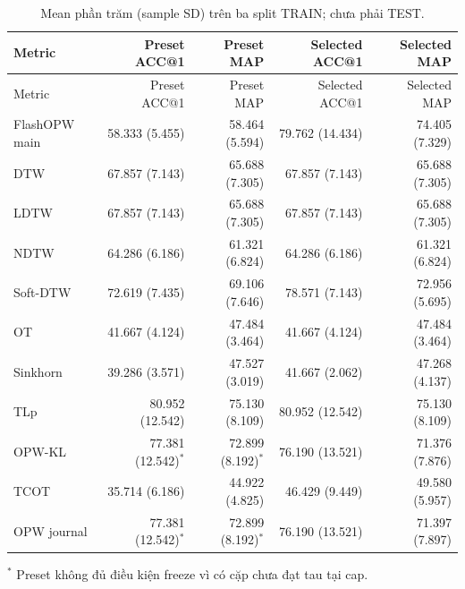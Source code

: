 \documentclass[11pt,a4paper]{article}
\begin{document}
\begin{longtable}{@{}lrrrr@{}}
\caption{Mean phần trăm (sample SD) trên ba split TRAIN; chưa phải TEST.}\label{tab:g3results}\\
\toprule
Metric & Preset ACC@1 & Preset MAP & Selected ACC@1 & Selected MAP \\
\midrule
\endfirsthead
\toprule
Metric & Preset ACC@1 & Preset MAP & Selected ACC@1 & Selected MAP \\
\midrule
\endhead
\bottomrule
\endfoot
FlashOPW main & 58.333 (5.455) & 58.464 (5.594) & 79.762 (14.434) & 74.405 (7.329) \\
DTW & 67.857 (7.143) & 65.688 (7.305) & 67.857 (7.143) & 65.688 (7.305) \\
LDTW & 67.857 (7.143) & 65.688 (7.305) & 67.857 (7.143) & 65.688 (7.305) \\
NDTW & 64.286 (6.186) & 61.321 (6.824) & 64.286 (6.186) & 61.321 (6.824) \\
Soft-DTW & 72.619 (7.435) & 69.106 (7.646) & 78.571 (7.143) & 72.956 (5.695) \\
OT & 41.667 (4.124) & 47.484 (3.464) & 41.667 (4.124) & 47.484 (3.464) \\
Sinkhorn & 39.286 (3.571) & 47.527 (3.019) & 41.667 (2.062) & 47.268 (4.137) \\
TLp & 80.952 (12.542) & 75.130 (8.109) & 80.952 (12.542) & 75.130 (8.109) \\
OPW-KL & 77.381 (12.542)$^{*}$ & 72.899 (8.192)$^{*}$ & 76.190 (13.521) & 71.376 (7.876) \\
TCOT & 35.714 (6.186) & 44.922 (4.825) & 46.429 (9.449) & 49.580 (5.957) \\
OPW journal & 77.381 (12.542)$^{*}$ & 72.899 (8.192)$^{*}$ & 76.190 (13.521) & 71.397 (7.897) \\
\end{longtable}
\endgroup
$^{*}$ Preset không đủ điều kiện freeze vì có cặp chưa đạt tau tại cap.
\end{document}
